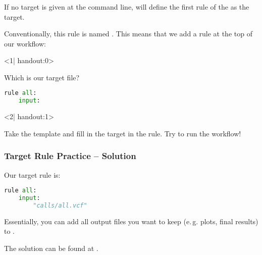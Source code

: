 \begin{frame}[fragile]
	\frametitle{}
	\begin{docs}
		If no target is given at the command line, \Snakemake{} will define the first rule of the  as the target.
	\end{docs}
	Conventionally, this rule is named . This means that we add a rule at the top of our workflow:\newline
	\begin{onlyenv}<1| handout:0>
		\begin{question}
			Which is our target file?
		\end{question}
		\begin{lstlisting}[language=Python,style=Python]
rule all:
	input: 
		\end{lstlisting}
	\end{onlyenv}
	\begin{onlyenv}<2| handout:1>
	   \begin{task}
	   	  Take the template  and fill in the target in the  rule. Try to run the workflow!
	   \end{task}
	\end{onlyenv}
\end{frame}

\begin{frame}[fragile]
	\frametitle{Target Rule Practice -- Solution}
	Our target rule is:
	\begin{lstlisting}[language=Python,style=Python]
rule all:
    input: 
        "calls/all.vcf"
	\end{lstlisting}
    \pause
    \begin{hint}
       Essentially, you can add all output files you want to keep (e.\,g. plots, final results) to .
    \end{hint}
    The solution can be found at .
\end{frame}
